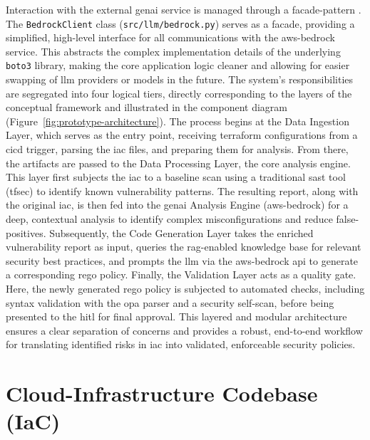 Interaction with the external \gls{genai} service is managed through a \gls{facade-pattern} \cite{gamma_design_2011}. The \texttt{BedrockClient} class (\texttt{src/llm/bedrock.py}) serves as a facade, providing a simplified, high-level interface for all communications with the \gls{aws-bedrock} service. This abstracts the complex implementation details of the underlying \texttt{\gls{boto3}} library, making the core application logic cleaner and allowing for easier swapping of \gls{llm} providers or models in the future.
The system's responsibilities are segregated into four logical tiers, directly corresponding to the layers of the conceptual framework and illustrated in the component diagram (Figure~\ref{fig:prototype-architecture}). The process begins at the Data Ingestion Layer, which serves as the entry point, receiving \gls{terraform} configurations from a \gls{cicd} trigger, parsing the \gls{iac} files, and preparing them for analysis. From there, the artifacts are passed to the Data Processing Layer, the core analysis engine. This layer first subjects the \gls{iac} to a baseline scan using a traditional \gls{sast} tool (tfsec) to identify known vulnerability patterns. The resulting report, along with the original \gls{iac}, is then fed into the \gls{genai} Analysis Engine (\gls{aws-bedrock}) for a deep, contextual analysis to identify complex misconfigurations and reduce \glspl{false-positive}. Subsequently, the Code Generation Layer takes the enriched vulnerability report as input, queries the \gls{rag}-enabled knowledge base for relevant security best practices, and prompts the \gls{llm} via the \gls{aws-bedrock} \gls{api} to generate a corresponding \gls{rego} policy. Finally, the Validation Layer acts as a quality gate. Here, the newly generated \gls{rego} policy is subjected to automated checks, including syntax validation with the \gls{opa} parser and a security self-scan, before being presented to the \gls{hitl} for final approval. This layered and modular architecture ensures a clear separation of concerns and provides a robust, end-to-end workflow for translating identified risks in \gls{iac} into validated, enforceable security policies.

\section{Cloud-Infrastructure Codebase (IaC)}

